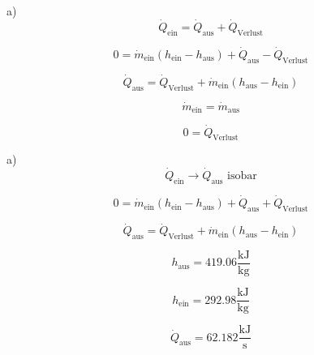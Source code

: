 a) \\
\begin{equation*}
\dot{Q}_{\text{ein}} = \dot{Q}_{\text{aus}} + \dot{Q}_{\text{Verlust}}
\end{equation*}

\begin{equation*}
0 = \dot{m}_{\text{ein}} (h_{\text{ein}} - h_{\text{aus}}) + \dot{Q}_{\text{aus}} - \dot{Q}_{\text{Verlust}}
\end{equation*}

\begin{equation*}
\dot{Q}_{\text{aus}} = \dot{Q}_{\text{Verlust}} + \dot{m}_{\text{ein}} (h_{\text{aus}} - h_{\text{ein}})
\end{equation*}

\begin{equation*}
\dot{m}_{\text{ein}} = \dot{m}_{\text{aus}}
\end{equation*}

\begin{equation*}
0 = \dot{Q}_{\text{Verlust}}
\end{equation*}

a) \\
\begin{equation*}
\dot{Q}_{\text{ein}} \rightarrow \dot{Q}_{\text{aus}} \text{ isobar}
\end{equation*}

\begin{equation*}
0 = \dot{m}_{\text{ein}} (h_{\text{ein}} - h_{\text{aus}}) + \dot{Q}_{\text{aus}} + \dot{Q}_{\text{Verlust}}
\end{equation*}

\begin{equation*}
\dot{Q}_{\text{aus}} = \dot{Q}_{\text{Verlust}} + \dot{m}_{\text{ein}} (h_{\text{aus}} - h_{\text{ein}})
\end{equation*}

\begin{equation*}
h_{\text{aus}} = 419.06 \frac{\text{kJ}}{\text{kg}}
\end{equation*}

\begin{equation*}
h_{\text{ein}} = 292.98 \frac{\text{kJ}}{\text{kg}}
\end{equation*}

\begin{equation*}
\dot{Q}_{\text{aus}} = 62.182 \frac{\text{kJ}}{\text{s}}
\end{equation*}